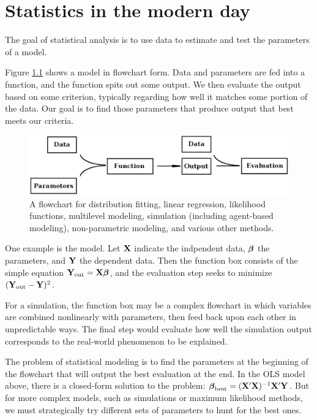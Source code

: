\chapter[Introduction]{Statistics in the modern day}
\iftwocol\begin{multicols}{2}\fi


The goal of statistical analysis is to use data to estimate and test
the parameters of a model.

Figure \ref{modelflow} shows a model in flowchart form.  Data and
parameters are fed into a function, and the function spits out some
output. We then evaluate the output based on some criterion, typically
regarding how well it matches some portion of the data. Our
goal is to find those parameters that produce output that best meets
our criteria.

\begin{figure}[htb]
\begin{center}
\includegraphics[width=\textwidth*\real{1.05}]{models.eps}
\end{center}

\caption{A flowchart for distribution fitting, linear regression,
likelihood functions, multilevel modeling,
simulation (including agent-based modeling), non-parametric modeling,
and various other methods.}
\label{modelflow}
\end{figure}

One example is the  model. Let ${\bf X}$
indicate the indpendent data, ${\mbox{\boldmath$\beta$}}$ the parameters, and ${\bf Y}$ the
dependent data. Then the function box consists of the simple equation
${\bf Y}_{\rm out} = {\bf X}{\mbox{\boldmath$\beta$}}$, and the evaluation step seeks to minimize
$({\bf Y}_{\rm out} - {\bf Y})^2$. 

For a simulation, the function box may be a complex flowchart in which
variables are combined nonlinearly with parameters, then feed back upon
each other in unpredictable ways. The final step
would evaluate how well the simulation output corresponds to the
real-world phenomenon to be explained.

The problem of statistical modeling is to find the parameters at the
beginning of the flowchart that will output the best evaluation at the
end.
In the OLS model above, there is a closed-form solution to the problem:
${\mbox{\boldmath$\beta$}}_{\rm best}=({\bf X}'{\bf X})^{-1}{\bf X}'{\bf Y}$.  But for more complex models,
such as simulations or maximum likelihood methods, we must strategically
try different sets of parameters to hunt for the best ones.



\end{multicols}
